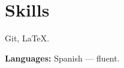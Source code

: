 \section{Skills}

\par Git, \LaTeX.

{

\setlength{\parskip}{\vspaceDefault}

{}
\label{sec:languages}

\par {\bfseries Languages:} Spanish --- fluent.

}
